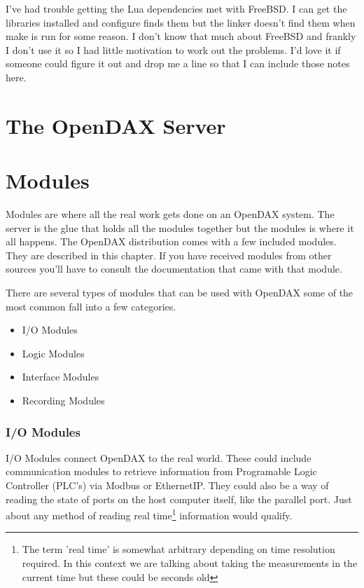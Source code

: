 \documentclass[letterpaper,10pt]{report}
\begin{document}
I've had trouble getting the Lua dependencies met with FreeBSD. I can get the libraries installed and configure finds them but the linker doesn't find them when make is run for some reason. I don't know that much about FreeBSD and frankly I don't use it so I had little motivation to work out the problems. I'd love it if someone could figure it out and drop me a line so that I can include those notes here. 

\chapter*{The OpenDAX Server}


\chapter*{Modules}
Modules are where all the real work gets done on an OpenDAX system.  The server is the glue that holds all the modules together but the modules is where it all happens.  The OpenDAX distribution comes with a few included modules.  They are described in this chapter.  If you have received modules from other sources you'll have to consult the documentation that came with that module.

There are several types of modules that can be used with OpenDAX some of the most common fall into a few categories.

\begin{itemize}
\item I/O Modules
\item Logic Modules
\item Interface Modules
\item Recording Modules
\end{itemize}

\subsection*{I/O Modules}
I/O Modules connect OpenDAX to the real world. These could include communication modules to retrieve information from Programable Logic Controller (PLC's) via Modbus or EthernetIP.  They could also be a way of reading the state of ports on the host computer itself, like the parallel port.  Just about any method of reading real time\footnote{The term 'real time' is somewhat arbitrary depending on time resolution required.  In this context we are talking about taking the measurements in the current time but these could be seconds old} information would qualify.
\end{document}
